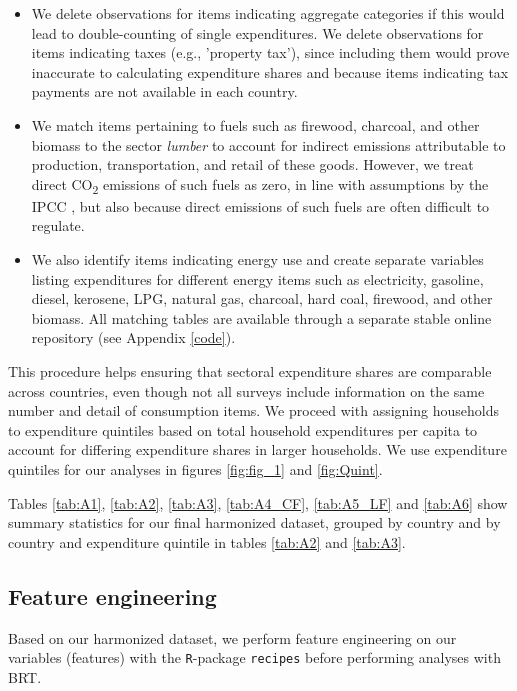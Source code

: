 \documentclass[12pt, a4paper]{article}
\begin{document}
\begin{refsection}
\begin{itemize}
    \item We delete observations for items indicating aggregate categories if this would lead to double-counting of single expenditures. We delete observations for items indicating taxes (e.g., 'property tax'), since including them would prove inaccurate to calculating expenditure shares and because items indicating tax payments are not available in each country.
    \item We match items pertaining to fuels such as firewood, charcoal, and other biomass to the sector \textit{lumber} to account for indirect emissions attributable to production, transportation, and retail of these goods. However, we treat direct CO\textsubscript{2} emissions of such fuels as zero, in line with assumptions by the IPCC \autocite{Grad.2023}, but also because direct emissions of such fuels are often difficult to regulate.
    \item We also identify items indicating energy use and create separate variables listing expenditures for different energy items such as electricity, gasoline, diesel, kerosene, LPG, natural gas, charcoal, hard coal, firewood, and other biomass. All matching tables are available through a separate stable online repository (see Appendix \ref{code}).
\end{itemize}

This procedure helps ensuring that sectoral expenditure shares are comparable across countries, even though not all surveys include information on the same number and detail of consumption items. We proceed with assigning households to expenditure quintiles based on total household expenditures per capita to account for differing expenditure shares in larger households. We use expenditure quintiles for our analyses in figures \ref{fig:fig_1} and \ref{fig:Quint}.

Tables \ref{tab:A1}, \ref{tab:A2}, \ref{tab:A3}, \ref{tab:A4_CF}, \ref{tab:A5_LF} and \ref{tab:A6} show summary statistics for our final harmonized dataset, grouped by country and by country and expenditure quintile in tables \ref{tab:A2} and \ref{tab:A3}. 


\subsection{Feature engineering} \label{sec:featureengineering}

Based on our harmonized dataset, we perform feature engineering on our variables (features) with the \texttt{R}-package \texttt{recipes} before performing analyses with BRT.


\end{refsection}
\end{document}
